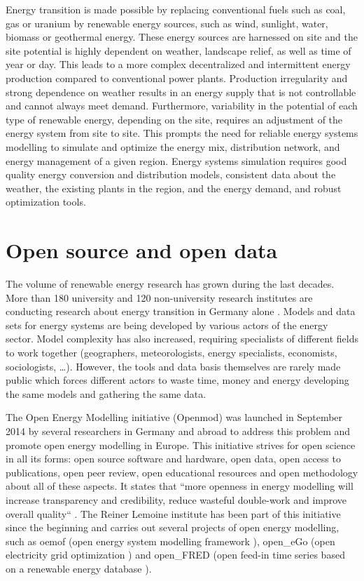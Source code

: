 Energy transition is made possible by replacing conventional fuels such as coal, gas or uranium by renewable energy sources, such as wind, sunlight, water, biomass or geothermal energy. These energy sources are harnessed on site and the site potential is highly dependent on weather, landscape relief, as well as time of year or day. This leads to a more complex decentralized and intermittent energy production compared to conventional power plants. \newline
Production irregularity and strong dependence on weather results in an energy supply that is not controllable and cannot always meet demand. Furthermore, variability in the potential of each type of renewable energy, depending on the site, requires an adjustment of the energy system from site to site. This prompts the need for reliable energy systems modelling to simulate and optimize the energy mix, distribution network, and energy management of a given region. Energy systems simulation requires good quality energy conversion and distribution models, consistent data about the weather, the existing plants in the region, and the energy demand, and robust optimization tools.


\section{Open source and open data}

The volume of renewable energy research has grown during the last decades. More than 180 university and 120 non-university research institutes are conducting research about energy transition in Germany alone \cite{bmbf_energiewende}. Models and data sets for energy systems are being developed by various actors of the energy sector. Model complexity has also increased, requiring specialists of different fields to work together (geographers, meteorologists, energy specialists, economists, sociologists, …). However, the tools and data basis themselves are rarely made public which forces different actors to waste time, money and energy developing the same models and gathering the same data. \newline

The Open Energy Modelling initiative (Openmod) was launched in September 2014 by several researchers in Germany and abroad \cite{openmod_workshop} to address this problem and promote open energy modelling in Europe. This initiative strives for open science in all its forms: open source software and hardware, open data, open access to publications, open peer review, open educational resources and open methodology about all of these aspects. It states that ``more openness in energy modelling will increase transparency and credibility, reduce wasteful double-work and improve overall quality`` \cite{openmod_manifesto}. \newline
The Reiner Lemoine institute has been part of this initiative since the beginning and  carries out several projects of open energy modelling, such as oemof (open energy system modelling framework \cite{rli_oemof}), open\_eGo (open electricity grid optimization \cite{rli_openego}) and open\_FRED (open feed-in time series based on a renewable energy database \cite{rli_openfred}). 

